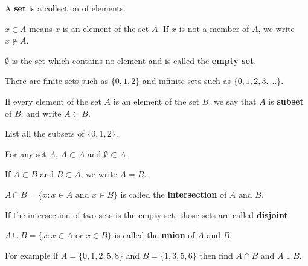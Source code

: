 \documentclass[calc1-main.tex]{subfiles}
\begin{document}
A \textbf{set} is a collection of elements.

$x\in A$ means $x$ is an element of the set $A$.
If $x$ is not a member of $A$, we write $x\notin A$.

$\emptyset$ is the set which contains no element and is called the \textbf{empty set}.

There are finite sets such as $\{0,1,2\}$ and infinite sets such as $\{0,1,2,3,...\}$.

If every element of the set $A$ is an element of the set $B$, we say that $A$ is \textbf{subset} of $B$, and write $A\subset B$.

\begin{example}
  List all the subsets of $\{0,1,2\}$.
\end{example}

For any set $A$, $A\subset A$ and $\emptyset \subset A$.

If $A\subset B$ and $B\subset A$, we write $A=B$.

$A\cap B = \{x:x\in A \text{ and } x\in B\}$ is called the \textbf{intersection} of $A$ and $B$.
\begin{center}
\end{center}

If the intersection of two sets is the empty set, those sets are called \textbf{disjoint}.

$A\cup B=\{x:x\in A \text{ or } x\in B\}$ is called the \textbf{union} of $A$ and $B$.
\begin{center}
\end{center}

\begin{example}
For example if $A=\{0,1,2,5,8\}$ and $B=\{1,3,5,6\}$ then find $A\cap B$ and $A\cup B$.
\end{example}
\end{document}
